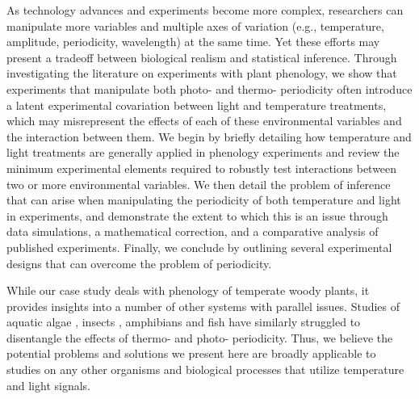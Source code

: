 \documentclass[11pt]{article}
\begin{document}
As technology advances and experiments become more complex, researchers can manipulate more variables and multiple axes of variation (e.g., temperature, amplitude, periodicity, wavelength) at the same time. Yet these efforts may present a tradeoff between biological realism and statistical inference. Through investigating the literature on experiments with plant phenology, we show that experiments that manipulate both photo- and thermo- periodicity often introduce a latent experimental covariation between light and temperature treatments, which may misrepresent the effects of each of these environmental variables and the interaction between them. We begin by briefly detailing how temperature and light treatments are generally applied in phenology experiments and review the minimum experimental elements required to robustly test interactions between two or more environmental variables. We then detail the problem of inference that can arise when manipulating the periodicity of both temperature and light in experiments, and demonstrate the extent to which this is an issue through data simulations, a mathematical correction, and a comparative analysis of published experiments. Finally, we conclude by outlining several experimental designs that can overcome the problem of periodicity. 

While our case study deals with phenology of temperate woody plants, it provides insights into a number of other systems with parallel issues. Studies of aquatic algae \citep{XU2019167}, insects \citep{ANDUAGA201846}, amphibians \citep{WRIGHT200433} and fish \citep{Olemda_2009} have similarly struggled to disentangle the effects of thermo- and photo- periodicity.  Thus, we believe the potential problems and solutions we present here are broadly applicable to studies on any other organisms and biological processes that utilize temperature and light signals. 
\end{document}
